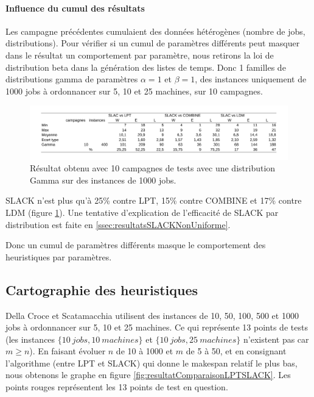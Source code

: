 \documentclass[a4paper,12pt]{report}
\theoremstyle{plain}				%
\theoremstyle{definition}				%
\newcommand{\lp}[1]{\todo[author=LP,color=yellow,inline]{#1}}
\newcommand{\jb}[1]{\todo[author=JB,color=orange,inline]{#1}}
\begin{document}
\paragraph{Influence du cumul des résultats}
Les campagne précédentes cumulaient des données hétérogènes (nombre de jobs, distributions). 
Pour vérifier si un cumul de paramètres différents peut masquer dans le résultat un comportement par paramètre, nous retirons la loi de distribution beta dans la génération des listes de temps.
Donc 1 familles de distributions gamma de paramètres $\alpha = 1$ et $\beta = 1$, 
  des instances uniquement de 1000 jobs à ordonnancer sur 5, 10 et 25 machines,
  sur 10 campagnes.
\begin{figure}
{\centering
\includegraphics[width=\columnwidth]{7_Resultat_Reproduction10Gamma1000.pdf}
\caption{Résultat obtenu avec 10 campagnes de tests avec une distribution Gamma sur des instances de 1000 jobs.}
\label{fig:resultatReproduction10Gamma1000}
\par}
\end{figure}

SLACK n'est plus qu'à 25\% contre LPT, 15\% contre COMBINE et 17\% contre LDM (figure \ref{fig:resultatReproduction10Gamma1000}).
Une tentative d'explication de l'efficacité de SLACK par distribution est faite en \ref{ssec:resultatsSLACKNonUniforme}. 

Donc un cumul de paramètres différents masque le comportement des heuristiques par paramètres. 


\subsection{Cartographie des heuristiques}
\label{ssec:resultatsCartographie}

Della Croce et Scatamacchia utilisent des instances de 10, 50, 100, 500 et 1000 jobs à ordonnancer sur 5, 10 et 25 machines. 
Ce qui représente 13 points de tests 
  (les instances 
  $\{10~jobs,10~machines\}$ et 
  $\{10~jobs,25~machines\}$ n'existent pas car $m\geq n$).
En faisant évoluer $n$ de 10 à 1000 et $m$ de 5 à 50, 
  et en consignant l'algorithme (entre LPT et SLACK) qui donne 
  le makespan relatif le plus bas, nous obtenons le graphe en figure \ref{fig:resultatComparaisonLPTSLACK}.
Les points rouges représentent les 13 points de test en question.
\end{document}

